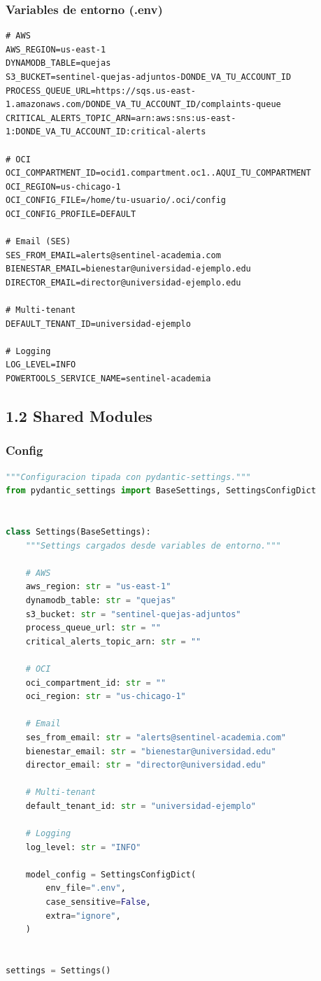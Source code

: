 \documentclass[11pt,a4paper]{article}
\begin{document}
\subsubsection{Variables de entorno (.env)}

\begin{lstlisting}[caption={src/.env}]
# AWS
AWS_REGION=us-east-1
DYNAMODB_TABLE=quejas
S3_BUCKET=sentinel-quejas-adjuntos-DONDE_VA_TU_ACCOUNT_ID
PROCESS_QUEUE_URL=https://sqs.us-east-1.amazonaws.com/DONDE_VA_TU_ACCOUNT_ID/complaints-queue
CRITICAL_ALERTS_TOPIC_ARN=arn:aws:sns:us-east-1:DONDE_VA_TU_ACCOUNT_ID:critical-alerts

# OCI
OCI_COMPARTMENT_ID=ocid1.compartment.oc1..AQUI_TU_COMPARTMENT
OCI_REGION=us-chicago-1
OCI_CONFIG_FILE=/home/tu-usuario/.oci/config
OCI_CONFIG_PROFILE=DEFAULT

# Email (SES)
SES_FROM_EMAIL=alerts@sentinel-academia.com
BIENESTAR_EMAIL=bienestar@universidad-ejemplo.edu
DIRECTOR_EMAIL=director@universidad-ejemplo.edu

# Multi-tenant
DEFAULT_TENANT_ID=universidad-ejemplo

# Logging
LOG_LEVEL=INFO
POWERTOOLS_SERVICE_NAME=sentinel-academia
\end{lstlisting}

\subsection{1.2 Shared Modules}

\subsubsection{Config}

\begin{lstlisting}[language=Python, caption={src/handlers/\_shared/config.py}]
"""Configuracion tipada con pydantic-settings."""
from pydantic_settings import BaseSettings, SettingsConfigDict


class Settings(BaseSettings):
    """Settings cargados desde variables de entorno."""

    # AWS
    aws_region: str = "us-east-1"
    dynamodb_table: str = "quejas"
    s3_bucket: str = "sentinel-quejas-adjuntos"
    process_queue_url: str = ""
    critical_alerts_topic_arn: str = ""

    # OCI
    oci_compartment_id: str = ""
    oci_region: str = "us-chicago-1"

    # Email
    ses_from_email: str = "alerts@sentinel-academia.com"
    bienestar_email: str = "bienestar@universidad.edu"
    director_email: str = "director@universidad.edu"

    # Multi-tenant
    default_tenant_id: str = "universidad-ejemplo"

    # Logging
    log_level: str = "INFO"

    model_config = SettingsConfigDict(
        env_file=".env",
        case_sensitive=False,
        extra="ignore",
    )


settings = Settings()
\end{lstlisting}
\end{document}
